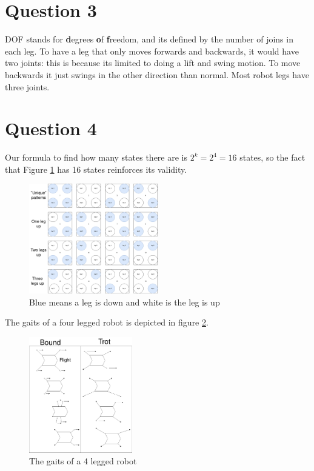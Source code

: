 \documentclass{article}
\newcommand\tab[1][1cm]{\hspace*{#1}}
\begin{document}
\section*{Question 3}
DOF stands for \textbf{d}egrees \textbf{o}f \textbf{f}reedom, and its defined by the
number of joins in each leg. To have a leg that only moves forwards and backwards,
it would have two joints: this is because its limited to doing a lift and swing motion.
To move backwards it just swings in the other direction than normal. Most robot legs
have three joints.
\newpage
\section*{Question 4}
Our formula to find how many states there are is $2^k = 2^4 = 16$ states, so the
fact that Figure \ref{gait} has 16 states reinforces its validity.
\begin{figure}[ht]
    \centering
    \includegraphics[width=0.5\textwidth]{img/gait.png}
    \caption{Blue means a leg is down and white is the leg is up}
    \label{gait}
\end{figure}

The gaits of a four legged robot is depicted in figure \ref{gait-walk}.
\begin{figure}[ht]
    \centering
    \includegraphics[width=0.4\textwidth]{img/gait-walk.png}
    \caption{The gaits of a 4 legged robot}
    \label{gait-walk}
\end{figure}
\newpage
\end{document}
